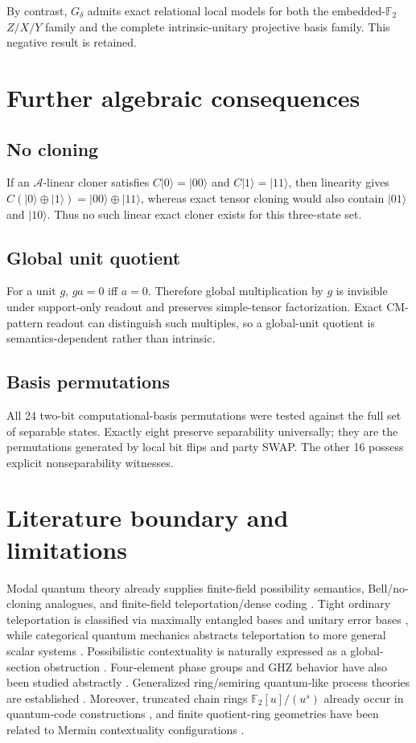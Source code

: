 \documentclass[11pt]{article}
\newcommand{\A}{\mathcal A}
\newcommand{\F}{\mathbb F}
\newcommand{\xorp}{\mathbin{\oplus}}
\newcommand{\ket}[1]{\lvert #1\rangle}
\begin{document}
By contrast, $G_\delta$ admits exact relational local models for both the
embedded-$\F_2$ $Z/X/Y$ family and the complete intrinsic-unitary projective
basis family.  This negative result is retained.

\section{Further algebraic consequences}

\subsection{No cloning}
If an $\A$-linear cloner satisfies $C\ket0=\ket{00}$ and
$C\ket1=\ket{11}$, then linearity gives
$C(\ket0\xorp\ket1)=\ket{00}\xorp\ket{11}$, whereas exact tensor cloning
would also contain $\ket{01}$ and $\ket{10}$.  Thus no such linear exact
cloner exists for this three-state set.

\subsection{Global unit quotient}
For a unit $g$, $ga=0$ iff $a=0$.  Therefore global multiplication by $g$ is
invisible under support-only readout and preserves simple-tensor
factorization.  Exact CM-pattern readout can distinguish such multiples, so a
global-unit quotient is semantics-dependent rather than intrinsic.

\subsection{Basis permutations}
All 24 two-bit computational-basis permutations were tested against the full
set of separable states.  Exactly eight preserve separability universally;
they are the permutations generated by local bit flips and party SWAP.  The
other 16 possess explicit nonseparability witnesses.

\section{Literature boundary and limitations}

Modal quantum theory already supplies finite-field possibility semantics,
Bell/no-cloning analogues, and finite-field teleportation/dense coding
\cite{SchumacherWestmoreland2012MQT,JamesOrtizSabry2011}.  Tight ordinary
teleportation is classified via maximally entangled bases and unitary error
bases \cite{Werner2001Teleportation}, while categorical quantum mechanics
abstracts teleportation to more general scalar systems
\cite{AbramskyCoecke2004}.
Possibilistic contextuality is naturally expressed as a global-section
obstruction \cite{AbramskyBrandenburger2011,AbramskyHardy2012}.  Four-element
phase groups and GHZ behavior have also been studied abstractly
\cite{CoeckeEdwardsSpekkens2011}.  Generalized ring/semiring quantum-like
process theories are established \cite{CoeckeEtAl2018Composition,Tull2020}.
Moreover, truncated chain rings $\F_2[u]/(u^s)$ already occur in quantum-code
constructions \cite{SariSiap2016,LiuLiu2017}, and finite quotient-ring
geometries have been related to Mermin contextuality configurations
\cite{SanigaPlanatMinarovjech2007}.
\end{document}
